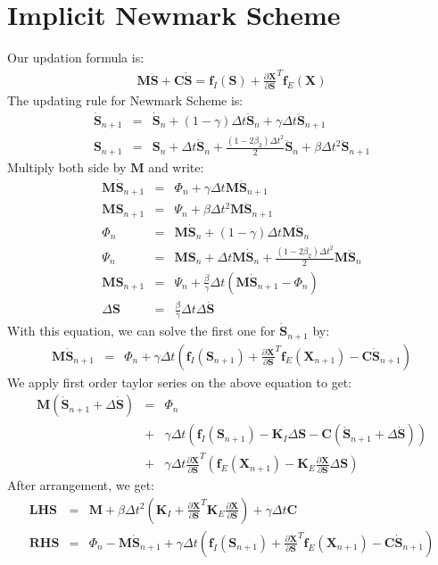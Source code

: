 \documentclass[annual]{acmsiggraph}
\newcommand{\E}[1]{\mathbf{#1}}
\newcommand{\FPP}[2]{\frac{\partial{#1}}{\partial{#2}}}
\begin{document}
\section{Implicit Newmark Scheme}
Our updation formula is:
\begin{eqnarray*}
\E{M}\ddot{\E{S}}+\E{C}\dot{\E{S}}=\E{f}_I(\E{S})+\FPP{\E{X}}{\E{S}}^T\E{f}_E(\E{X})
\end{eqnarray*}
The updating rule for Newmark Scheme is:
\begin{eqnarray*}
\dot{\E{S}}_{n+1}&=&\dot{\E{S}}_n+(1-\gamma)\Delta t\ddot{\E{S}}_n+\gamma\Delta t\ddot{\E{S}}_{n+1}	\\
\E{S}_{n+1}&=&\E{S}_n+\Delta t\dot{\E{S}}_n+\frac{(1-2\beta_2)\Delta t^2}{2}\ddot{\E{S}}_n+\beta\Delta t^2\ddot{\E{S}}_{n+1}
\end{eqnarray*}
Multiply both side by $\E{M}$ and write:
\begin{eqnarray*}
\E{M}\dot{\E{S}}_{n+1}&=&\Phi_n+\gamma\Delta t\E{M}\ddot{\E{S}}_{n+1}	\\
\E{M}\E{S}_{n+1}&=&\Psi_n+\beta\Delta t^2\E{M}\ddot{\E{S}}_{n+1}	\\
\Phi_n&=&\E{M}\dot{\E{S}}_n+(1-\gamma)\Delta t\E{M}\ddot{\E{S}}_n	\\
\Psi_n&=&\E{M}\E{S}_n+\Delta t\E{M}\dot{\E{S}}_n+\frac{(1-2\beta_2)\Delta t^2}{2}\E{M}\ddot{\E{S}}_n	\\
\E{M}\E{S}_{n+1}&=&\Psi_n+\frac{\beta}{\gamma}\Delta t(\E{M}\dot{\E{S}}_{n+1}-\Phi_n)	\\
\Delta\E{S}&=&\frac{\beta}{\gamma}\Delta t\Delta\dot{\E{S}}
\end{eqnarray*}
With this equation, we can solve the first one for $\dot{\E{S}}_{n+1}$ by:
\begin{eqnarray*}
\E{M}\dot{\E{S}}_{n+1}&=&\Phi_n+\gamma\Delta t(\E{f}_I(\E{S}_{n+1})+\FPP{\E{X}}{\E{S}}^T\E{f}_E(\E{X}_{n+1})-\E{C}\dot{\E{S}}_{n+1})
\end{eqnarray*}
We apply first order taylor series on the above equation to get:
\begin{eqnarray*}
\E{M}(\dot{\E{S}}_{n+1}+\Delta\dot{\E{S}})&=&\Phi_n	\\
&+&\gamma\Delta t(\E{f}_I(\E{S}_{n+1})-\E{K}_I\Delta\E{S}-\E{C}(\dot{\E{S}}_{n+1}+\Delta\dot{\E{S}}))	\\
&+&\gamma\Delta t\FPP{\E{X}}{\E{S}}^T(\E{f}_E(\E{X}_{n+1})-\E{K}_E\FPP{\E{X}}{\E{S}}\Delta\E{S})
\end{eqnarray*}
After arrangement, we get:
\begin{eqnarray*}
\E{LHS}&=&\E{M}+\beta\Delta t^2(\E{K}_I+\FPP{\E{X}}{\E{S}}^T\E{K}_E\FPP{\E{X}}{\E{S}})+\gamma\Delta t\E{C}	\\
\E{RHS}&=&\Phi_n-\E{M}\dot{\E{S}}_{n+1}+\gamma\Delta t(\E{f}_I(\E{S}_{n+1})+\FPP{\E{X}}{\E{S}}^T\E{f}_E(\E{X}_{n+1})-\E{C}\dot{\E{S}}_{n+1})
\end{eqnarray*}
\end{document}
